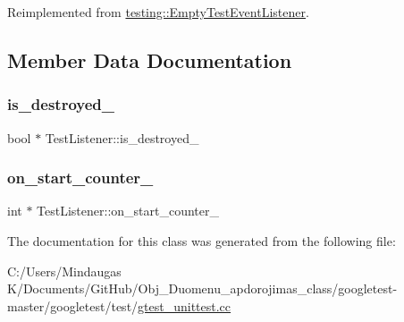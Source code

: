 Reimplemented from \mbox{\hyperlink{classtesting_1_1_empty_test_event_listener_ac3f5033fcd82080edb45f546ce9854fe}{testing\+::\+Empty\+Test\+Event\+Listener}}.



\subsection{Member Data Documentation}
\mbox{\label{class_test_listener_a0185f234a8dc2f93b8ca0ba6d9a7ae41}} 
\subsubsection{\texorpdfstring{is\_destroyed\_}{is\_destroyed\_}}
{\footnotesize\ttfamily bool $\ast$ Test\+Listener\+::is\+\_\+destroyed\+\_\+\hspace{0.3cm}{\ttfamily [private]}}

\mbox{\label{class_test_listener_ac4c9d9e15b1d1d54ec522bc605879d44}} 
\subsubsection{\texorpdfstring{on\_start\_counter\_}{on\_start\_counter\_}}
{\footnotesize\ttfamily int $\ast$ Test\+Listener\+::on\+\_\+start\+\_\+counter\+\_\+\hspace{0.3cm}{\ttfamily [private]}}



The documentation for this class was generated from the following file\+:\begin{DoxyCompactItemize}
\item 
C\+:/\+Users/\+Mindaugas K/\+Documents/\+Git\+Hub/\+Obj\+\_\+\+Duomenu\+\_\+apdorojimas\+\_\+class/googletest-\/master/googletest/test/\mbox{\hyperlink{googletest-master_2googletest_2test_2gtest__unittest_8cc}{gtest\+\_\+unittest.\+cc}}\end{DoxyCompactItemize}

